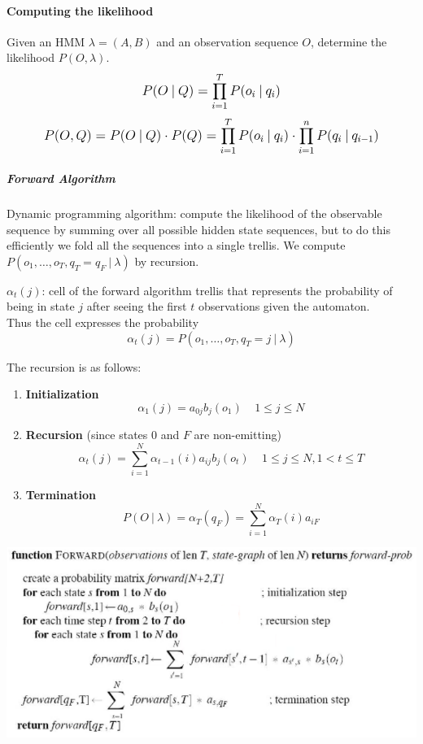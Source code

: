 \documentclass[10pt]{report}
\begin{document}
\paragraph{Computing the likelihood} Given an HMM $\lambda = (A, B)$ and an observation sequence $O$, determine the likelihood $P(O, \lambda)$.
$$\mathlarger{P(O\:|\:Q)=\prod_{i=1}^T P(o_i\:|\:q_i)}$$
$$\mathlarger{P(O,Q) = P(O\:|\:Q)\cdot P(Q) = \prod_{i=1}^T P(o_i\:|\:q_i)\cdot\prod_{i=1}^n P(q_i\:|\:q_{i-1})}$$
\subparagraph{Forward Algorithm} Dynamic programming algorithm: compute the likelihood of the observable sequence by summing over all possible hidden state sequences, but to do this efficiently we fold all the sequences into a single trellis. We compute $P(o_1,\ldots,o_T,q_T = q_F\:|\:\lambda)$ by recursion.\begin{list}{}{}
	\item $\alpha_t(j)$: cell of the forward algorithm trellis that represents the probability of being in state $j$ after seeing the first $t$ observations given the automaton.\\
	Thus the cell expresses the probability $$\alpha_t(j) = P(o_1,\ldots,o_T,q_T=j\:|\:\lambda)$$
	\item The recursion is as follows:
	\begin{enumerate}
		\item \textbf{Initialization} $$\alpha_1(j) = a_{0j}b_j(o_1)\:\:\:\:\:1\leq j\leq N$$
		\item \textbf{Recursion} (since states 0 and $F$ are non-emitting) $$\alpha_t(j) = \sum_{i=1}^N\alpha_{t-1}(i)a_{ij}b_j(o_t)\:\:\:\:\:1\leq j\leq N, 1<t\leq T$$
		\item \textbf{Termination} $$P(O\:|\:\lambda) =\alpha_T(q_F)=\sum_{i=1}^N\alpha_T(i)a_{iF}$$
	\end{enumerate}
\end{list}
\begin{center}
	\includegraphics[scale=0.5]{15.png}
\end{center}
\end{document}
